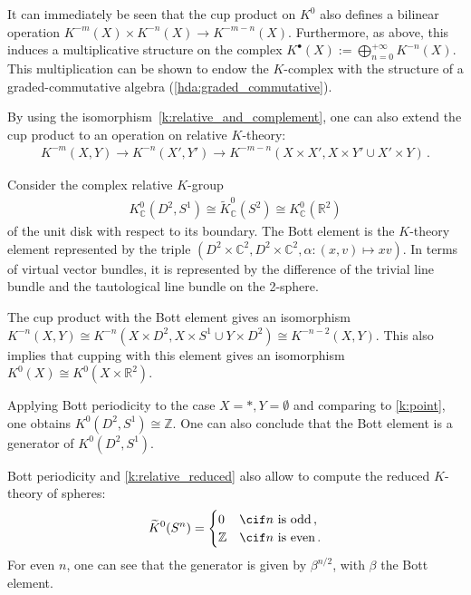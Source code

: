     \begin{property}
        It can immediately be seen that the cup product on $K^0$ also defines a bilinear operation $K^{-m}(X)\times K^{-n}(X)\rightarrow K^{-m-n}(X)$. Furthermore, as above, this induces a multiplicative structure on the complex $K^\bullet(X):=\bigoplus_{n=0}^{+\infty}K^{-n}(X)$. This multiplication can be shown to endow the $K$-complex with the structure of a graded-commutative algebra (\cref{hda:graded_commutative}).

        By using the isomorphism~\eqref{k:relative_and_complement}, one can also extend the cup product to an operation on relative $K$-theory:
        \begin{gather}
            K^{-m}(X,Y)\rightarrow K^{-n}(X',Y')\rightarrow K^{-m-n}(X\times X',X\times Y'\cup X'\times Y)\,.
        \end{gather}
    \end{property}

    \begin{notation}
        Consider the complex relative $K$-group
        \begin{gather}
            K^0_{\mathbb{C}}(D^2,S^1)\cong\widetilde{K}^0_{\mathbb{C}}(S^2)\cong K^0_{\mathbb{C}}(\mathbb{R}^2)
        \end{gather}
        of the unit disk with respect to its boundary. The Bott element is the $K$-theory element represented by the triple $\left(D^2\times\mathbb{C}^2,D^2\times\mathbb{C}^2,\alpha:(x,v)\mapsto xv\right)$. In terms of virtual vector bundles, it is represented by the difference of the trivial line bundle and the tautological line bundle on the 2-sphere.
    \end{notation}
    \begin{theorem}
        The cup product with the Bott element gives an isomorphism $K^{-n}(X,Y)\cong K^{-n}(X\times D^2,X\times S^1\cup Y\times D^2)\cong K^{-n-2}(X,Y)$. This also implies that cupping with this element gives an isomorphism $K^0(X)\cong K^0(X\times\mathbb{R}^2)$.
    \end{theorem}
    \begin{result}
        Applying Bott periodicity to the case $X=\ast,Y=\emptyset$ and comparing to \cref{k:point}, one obtains $K^0(D^2,S^1)\cong\mathbb{Z}$. One can also conclude that the Bott element is a generator of $K^0(D^2,S^1)$.
    \end{result}
    \begin{result}[Spheres]
        Bott periodicity and \cref{k:relative_reduced} also allow to compute the reduced $K$-theory of spheres:
        \begin{gather}
            \widetilde{K}^0(S^n) =
            \begin{cases}
                0&\cif n\text{ is odd}\,,\\
                \mathbb{Z}&\cif n\text{ is even}\,.
            \end{cases}
        \end{gather}
        For even $n$, one can see that the generator is given by $\beta^{n/2}$, with $\beta$ the Bott element.
    \end{result}

